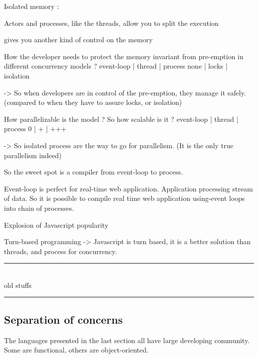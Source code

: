 Isolated memory :

Actors and processes, like the threads, allow you to split the execution 

 gives you another kind of control on the memory






How the developer needs to protect the memory invariant from pre-emption in different concurrency models ?
  event-loop  |  thread  |   process
     none     |  locks   |  isolation

-> So when developers are in control of the pre-emption, they manage it safely.
(compared to when they have to assure locks, or isolation)


How parallelizable is the model ? So how scalable is it ?
  event-loop  |  thread  |   process
       0      |     +    |     +++

-> So isolated process are the way to go for parallelism.
(It is the only true parallelism indeed)

So the sweet spot is a compiler from event-loop to process.


Event-loop is perfect for real-time web application.
Application processing stream of data.
So it is possible to compile real time web application using-event loops into chain of processes.



Explosion of Javascript popularity

Turn-based programming
  -> Javascript is turn based, it is a better solution than threads, and process for concurrency.






\begin{center}
\rule{4cm}{0.4pt}\\
old stuffs\\
\rule{4cm}{0.4pt}
\end{center}



\subsection{Separation of concerns}



The languages presented in the last section all have large developing community. Some are functional, others are object-oriented.

